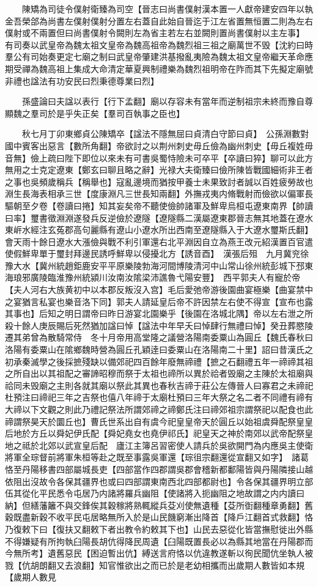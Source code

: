 　　陳矯為司徒令僕射衛臻為司空【晉志曰尚書僕射漢本置一人獻帝建安四年以執金吾榮郃為尚書左僕射僕射分置左右蓋自此始自晉迄于江左省置無恒置二則為左右僕射或不兩置但曰尚書僕射令闕則左為省主若左右並闕則置尚書僕射以主左事】　有司奏以武皇帝為魏太祖文皇帝為魏高祖帝為魏烈祖三祖之廟萬世不毁【沈約曰時羣公有司始奏更定七廟之制曰武皇帝肇建洪基撥亂夷險為魏太祖文皇帝繼天革命應期受禪為魏高祖上集成大命清定華夏興制禮樂為魏烈祖明帝在阼而其下先擬定廟號非禮也諡法有功安民曰烈秉德尊業曰烈】

　　孫盛論曰夫諡以表行【行下孟翻】廟以存容未有當年而逆制祖宗未終而豫自尊顯魏之羣司於是乎失正矣【羣司百執事之臣也】

　　秋七月丁卯東鄉貞公陳矯卒【諡法不隱無屈曰貞清白守節曰貞】　公孫淵數對國中賓客出惡言【數所角翻】帝欲討之以荆州刺史毋丘儉為幽州刺史【毋丘複姓毋音無】儉上疏曰陛下即位以來未有可書吳蜀恃險未可卒平【卒讀曰猝】聊可以此方無用之士克定遼東【鄭玄曰聊且略之辭】光禄大夫衛臻曰儉所陳皆戰國細術非王者之事也吳頻歲稱兵【稱舉也】寇亂邊境而猶按甲養士未果致討者誠以百姓疲勞故也淵生長海表相承三世【度康淵凡三世長知兩翻】外撫戎夷内脩戰射而儉欲以偏軍長驅朝至夕卷【卷讀曰捲】知其妄矣帝不聽使儉帥諸軍及鮮卑烏桓屯遼東南界【帥讀曰率】璽書徵淵淵遂發兵反逆儉於遼隧【遼隧縣二漢屬遼東郡晉志無其地蓋在遼水東㟁水經注玄菟郡高句麗縣有遼山小遼水所出西南至遼隧縣入于大遼水璽斯氏翻】會天雨十餘日遼水大漲儉與戰不利引軍還右北平淵因自立為燕王改元紹漢置百官遣使假鮮卑單于璽封拜邊民誘呼鮮卑以侵擾北方【誘音酉】　漢張后殂　九月冀兖徐豫大水【冀州統趙鉅鹿安平平原樂陵勃海河間博陵清河中山常山徐州統彭城下邳東海琅邪廣陵臨淮豫州統潁川汝南汝隂梁沛譙魯弋陽安豐】　西平郭夫人有寵於帝【夫人河右大族黄初中以本郡反叛沒入宫】毛后愛弛帝游後園曲宴極樂【曲宴禁中之宴猶言私宴也樂音洛下同】郭夫人請延皇后帝不許因禁左右使不得宣【宣布也露其事也】后知之明日謂帝曰昨日游宴北園樂乎【後園在洛城北隅】帝以左右泄之所殺十餘人庚辰賜后死然猶加諡曰悼【諡法中年早夭曰悼肆行無禮曰悼】癸丑葬愍陵遷其弟曾為散騎常侍　冬十月帝用高堂隆之議營洛陽南委粟山為圓丘【魏氏春秋曰洛陽有委粟山在隂鄉魏時營為圓丘孔穎逹曰委粟山在洛陽南二十里】詔曰昔漢氏之初承秦滅學之後採摭殘缺以備郊祀四百餘年廢無禘禮【摭之石翻禮五年一禘禘其祖之所自出以其祖配之審諦昭穆而祭于太祖也禘所以異於祫者毁廟之主陳於太祖廟與祫同未毁廟之主則各就其廟以祭此其異也春秋吉禘于莊公左傳晉人曰寡君之未禘祀杜預注曰禘祀三年之吉祭也僖八年禘于太廟杜預曰三年大祭之名二者不同禮有禘有大禘以下文觀之則此乃禮記祭法所謂郊禘之禘鄭氏注曰禘郊祖宗謂祭祀以配食也此禘謂祭昊天於圜丘也】曹氏世系出自有虞今祀皇皇帝天於圓丘以始祖虞舜配祭皇皇后地於方丘以舜妃伊氏配【舜妃堯女也堯伊祁氏】祀皇天之神於南郊以武帝配祭皇地之祗於北郊以武宣皇后配　廬江主簿呂習密使人請兵於吳欲開門為内應吳主使衛將軍全琮督前將軍朱桓等赴之既至事露吳軍還【琮徂宗翻還從宣翻又如字】　諸葛恪至丹陽移書四部屬城長吏【四部當作四郡謂吳郡會稽新都鄱陽皆與丹陽隣接山越依阻出沒故令各保其疆界也或曰四部謂東南西北四部都尉也】令各保其疆界明立部伍其從化平民悉令屯居乃内諸將羅兵幽阻【使諸將入扼幽阻之地故謂之内内讀曰納】但繕藩籬不與交鋒俟其穀稼將熟輒縱兵芟刈使無遺種【芟所衘翻種章勇翻】舊穀既盡新穀不收平民屯居略無所入於是山民饑窮漸出降首【降戶江翻首式救翻】恪乃復敕下曰【復扶又翻敕下者出教令約敕其下也】山民去惡從化皆當撫慰徙出外縣不得嫌疑有所拘執臼陽長胡伉得降民周遺【臼陽既置長必以為縣其地當在丹陽郡而今無所考】遺舊惡民【困迫暫出伉】縛送言府恪以伉違教遂斬以徇民聞伉坐執人被戮【伉胡朗翻又去浪翻】知官惟欲出之而已於是老幼相攜而出歲期人數皆如本規【歲期人數見